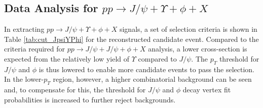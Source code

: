 \documentclass[10pt,twocolumn]{article}
\begin{document}
\subsection{Data Analysis for \texorpdfstring{$pp\to J/\psi+\Upsilon+\phi+X$}{pp -> J/psi + Upsilon + phi}}

In extracting $pp\to J/\psi+\Upsilon+\phi+X$ signals, a set of selection criteria is shown in Table \ref{tab:cut_JpsiYPhi} for the reconstructed candidate event. Compared to the criteria required for $pp \to J/\psi+J/\psi+\phi+X$ analysis, a lower cross-section is expected from the relatively low yield of $\Upsilon$ compared to $J/\psi$. The $p_T$ threshold for $J/\psi$ and $\phi$ is thus lowered to enable more candidate events to pass the selection. In the lower-$p_T$ region, however, a higher combinatorial background can be seen and, to compensate for this, the threshold for $J/\psi$ and $\phi$ decay vertex fit probabilities is increased to further reject backgrounds.
\end{document}
